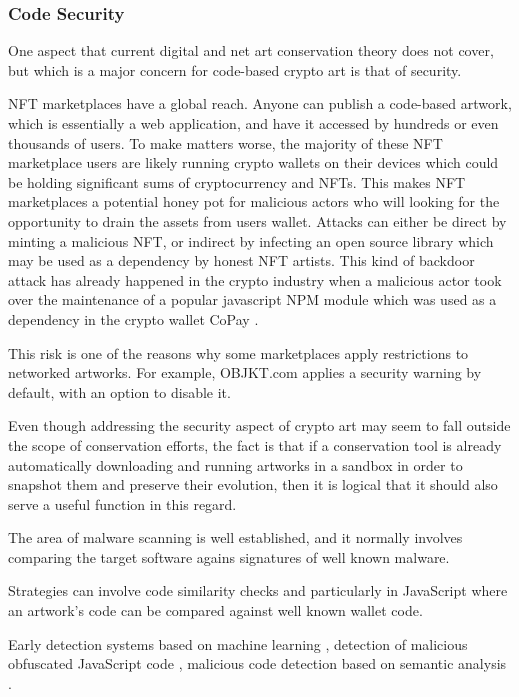 \subsubsection{Code Security}

One aspect that current digital and net art conservation theory does not cover, but which is a major concern for code-based crypto art is that of security.

NFT marketplaces have a global reach. Anyone can publish a code-based artwork, which is essentially a web application, and have it accessed by hundreds or even thousands of users. To make matters worse, the majority of these NFT marketplace users are likely running crypto wallets on their devices which could be holding significant sums of cryptocurrency and NFTs. This makes NFT marketplaces a potential honey pot for malicious actors who will looking for the opportunity to drain the assets from users wallet. Attacks can either be direct by minting a malicious NFT, or indirect by infecting an open source library which may be used as a dependency by honest NFT artists. This kind of backdoor attack has already happened in the crypto industry when a malicious actor took over the maintenance of a popular javascript NPM module which was used as a dependency in the crypto wallet CoPay \cite{haworthPopularJavaScriptDependency2018}.

This risk is one of the reasons why some marketplaces apply restrictions to networked artworks.
For example, OBJKT.com applies a security warning by default, with an option to disable it.

Even though addressing the security aspect of crypto art may seem to fall outside the scope of conservation efforts, the fact is that if a conservation tool is already automatically downloading and running artworks in a sandbox in order to snapshot them and preserve their evolution, then it is logical that it should also serve a useful function in this regard.

The area of malware scanning is well established, and it normally involves comparing the target software agains signatures of well known malware.


Strategies can involve code similarity checks \cite{ragkhitwetsagulComparisonCodeSimilarity2018} and particularly in JavaScript \cite{alfagehCloneDetectionTechniques2020} where an artwork's code can be compared against well known wallet code.


Early detection systems based on machine learning \cite{schuttEarlyDetectionMalicious2012}, detection of malicious obfuscated JavaScript code \cite{likarishObfuscatedMaliciousJavascript2009} \cite{fassJaStFullySyntactic2018}, malicious code detection based on semantic analysis \cite{fangDetectingMaliciousJavaScript2020}.


